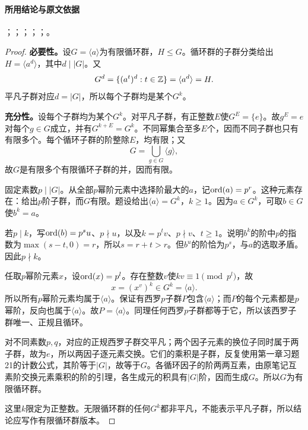 \paragraph{所用结论与原文依据}
；；；；；。


\begin{proof}
\textbf{必要性。}设$G=\langle a\rangle$为有限循环群，$H\leq G$。循环群的子群分类给出$H=\langle a^d\rangle$，其中$d\mid|G|$。又
\[
G^d=\{(a^t)^d:t\in\mathbb Z\}=\langle a^d\rangle=H.
\]
平凡子群对应$d=|G|$，所以每个子群均是某个$G^k$。

\textbf{充分性。}设每个子群均为某个$G^k$。对平凡子群，有正整数$E$使$G^E=\{e\}$。故$g^E=e$对每个$g\in G$成立，并有$G^{k+E}=G^k$。不同幂集合至多$E$个，因而不同子群也只有有限多个。每个循环子群的阶整除$E$，均有限；又
\[
G=\bigcup_{g\in G}\langle g\rangle,
\]
故$G$是有限多个有限循环子群的并，因而有限。

固定素数$p\mid|G|$。从全部$p$幂阶元素中选择阶最大的$a$，记$\operatorname{ord}(a)=p^r$。这种元素存在：给出$p$阶子群，而$G$有限。题设给出$\langle a\rangle=G^k$，$k\geq1$。因为$a\in G^k$，可取$b\in G$使$b^k=a$。

若$p\mid k$，写$\operatorname{ord}(b)=p^su$、$p\nmid u$，以及$k=p^tv$、$p\nmid v$、$t\geq1$。说明$b^k$的阶中$p$的指数为$\max(s-t,0)=r$，所以$s=r+t>r$。但$b^u$的阶恰为$p^s$，与$a$的选取矛盾。因此$p\nmid k$。

任取$p$幂阶元素$x$，设$\operatorname{ord}(x)=p^l$。存在整数$v$使$kv\equiv1\pmod{p^l}$，故
\[
x=(x^v)^k\in G^k=\langle a\rangle.
\]
所以所有$p$幂阶元素均属于$\langle a\rangle$。保证有西罗$p$子群$P$包含$\langle a\rangle$；而$P$的每个元素都是$p$幂阶，反向也属于$\langle a\rangle$。故$P=\langle a\rangle$。同理任何西罗$p$子群都等于它，所以该西罗子群唯一、正规且循环。

对不同素数$p,q$，对应的正规西罗子群交平凡；两个因子元素的换位子同时属于两子群，故为$e$，所以两因子逐元素交换。它们的乘积是子群，反复使用第一章习题21的计数公式，其阶等于$|G|$，故等于$G$。各循环因子的阶两两互素，由原笔记互素阶交换元素乘积的阶的引理，各生成元的积具有$|G|$阶，因而生成$G$。所以$G$为有限循环群。

这里$k$限定为正整数。无限循环群的任何$G^k$都非平凡，不能表示平凡子群，所以结论应写作有限循环群版本。
\end{proof}

